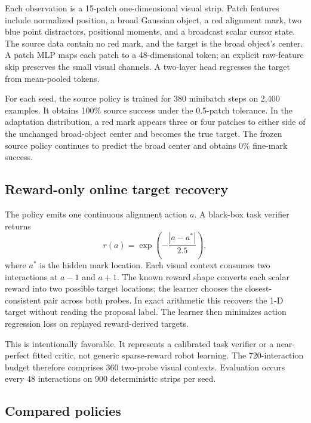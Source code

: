 \documentclass[11pt]{article}
\begin{document}
Each observation is a 15-patch one-dimensional visual strip. Patch features include normalized position, a broad Gaussian object, a red alignment mark, two blue point distractors, positional moments, and a broadcast scalar cursor state. The source data contain no red mark, and the target is the broad object's center. A patch MLP maps each patch to a 48-dimensional token; an explicit raw-feature skip preserves the small visual channels. A two-layer head regresses the target from mean-pooled tokens.

For each seed, the source policy is trained for 380 minibatch steps on 2,400 examples. It obtains 100\% source success under the 0.5-patch tolerance. In the adaptation distribution, a red mark appears three or four patches to either side of the unchanged broad-object center and becomes the true target. The frozen source policy continues to predict the broad center and obtains 0\% fine-mark success.

\subsection{Reward-only online target recovery}

The policy emits one continuous alignment action $a$. A black-box task verifier returns
\begin{equation}
  r(a)=\exp\left(-\frac{|a-a^*|}{2.5}\right),
\end{equation}
where $a^*$ is the hidden mark location. Each visual context consumes two interactions at $a-1$ and $a+1$. The known reward shape converts each scalar reward into two possible target locations; the learner chooses the closest-consistent pair across both probes. In exact arithmetic this recovers the 1-D target without reading the proposal label. The learner then minimizes action regression loss on replayed reward-derived targets.

This is intentionally favorable. It represents a calibrated task verifier or a near-perfect fitted critic, not generic sparse-reward robot learning. The 720-interaction budget therefore comprises 360 two-probe visual contexts. Evaluation occurs every 48 interactions on 900 deterministic strips per seed.

\subsection{Compared policies}
\end{document}
